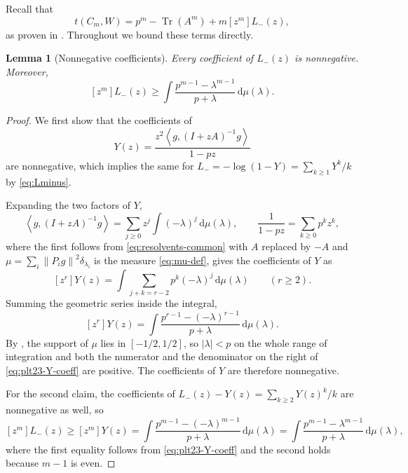 \documentclass[11pt]{article}
\newtheorem{lemma}[theorem]{Lemma}
\numberwithin{equation}{section}
\newcommand{\ip}[2]{\left\langle #1,#2\right\rangle}
\newcommand{\norm}[1]{\left\lVert #1\right\rVert}
\newcommand{\Tr}{\operatorname{Tr}}
\newcommand{\dd}{\,\mathrm d}
\begin{document}
Recall that
\begin{equation}\label{eq:plt23-one-sided-identity}
  t(C_m,W)=p^m-\Tr(A^m)+m[z^m]L_-(z),
\end{equation}
as proven in .  Throughout  we
bound these terms directly.

\begin{lemma}[Nonnegative coefficients]\label{lem:plt23-one-sided-identity}
  Every coefficient of $L_-(z)$ is nonnegative.  Moreover,
  \begin{equation}\label{eq:plt23-Lminus-linear-lower}
    [z^m]L_-(z)\ge\int\frac{p^{m-1}-\lambda^{m-1}}{p+\lambda}\dd\mu(\lambda).
  \end{equation}
\end{lemma}

\begin{proof}
  We first show that the coefficients of
  \[
    Y(z)=\frac{z^2\ip g{(I+zA)^{-1}g}}{1-pz}
  \]
  are nonnegative, which implies the same for
  $L_-=-\log(1-Y)=\sum_{k\ge1}Y^k/k$ by \eqref{eq:Lminus}.

  Expanding the two factors of $Y$,
  \[
    \ip g{(I+zA)^{-1}g}=\sum_{j\ge0}z^j\int(-\lambda)^j\dd\mu(\lambda),
    \qquad
    \frac{1}{1-pz}=\sum_{k\ge0}p^kz^k,
  \]
  where the first follows from \eqref{eq:resolvents-common} with $A$ replaced
  by $-A$ and $\mu=\sum_i\norm{P_ig}^2\delta_{\lambda_i}$ is the measure
  \eqref{eq:mu-def}, gives the coefficients of $Y$ as
  \[
    [z^r]Y(z)
    =\int\sum_{j+k=r-2}p^k(-\lambda)^j\dd\mu(\lambda)
    \qquad(r\ge2).
  \]
  Summing the geometric series inside the integral,
  \begin{equation}\label{eq:plt23-Y-coeff}
    [z^r]Y(z)
    =\int\frac{p^{r-1}-(-\lambda)^{r-1}}{p+\lambda}\dd\mu(\lambda).
  \end{equation}
  By , the support of $\mu$ lies in $[-1/2,1/2]$, so
  $|\lambda|<p$ on the whole range of integration and both the numerator and
  the denominator on the right of \eqref{eq:plt23-Y-coeff} are positive.  The
  coefficients of $Y$ are therefore nonnegative.

  For the second claim, the coefficients of
  $L_-(z)-Y(z)=\sum_{k\ge2}Y(z)^k/k$ are nonnegative as well, so
  \[
    [z^m]L_-(z)\ge[z^m]Y(z)
    =\int\frac{p^{m-1}-(-\lambda)^{m-1}}{p+\lambda}\dd\mu(\lambda)
    =\int\frac{p^{m-1}-\lambda^{m-1}}{p+\lambda}\dd\mu(\lambda),
  \]
  where the first equality follows from \eqref{eq:plt23-Y-coeff} and the
  second holds because $m-1$ is even.
\end{proof}
\end{document}
